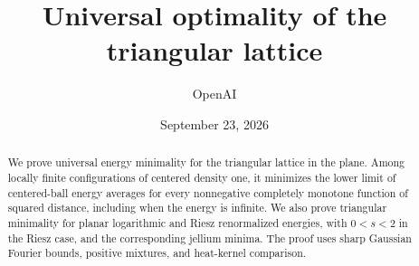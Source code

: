 \documentclass[11pt]{article}
\title{Universal optimality of the triangular lattice}
\author{OpenAI}
\date{September 23, 2026}
\begin{document}
\maketitle
\begin{abstract}
We prove universal energy minimality for the triangular lattice in the plane.
Among locally finite configurations of centered density one, it minimizes the
lower limit of centered-ball energy averages for every nonnegative completely
monotone function of squared distance, including when the energy is infinite.
We also prove triangular minimality for planar logarithmic and Riesz
renormalized energies, with $0<s<2$ in the Riesz case, and the corresponding
jellium minima. The proof uses sharp Gaussian Fourier bounds, positive
mixtures, and heat-kernel comparison.
\end{abstract}








\appendix



\setlength{\bibsep}{4pt plus 1pt minus 1pt}

\end{document}
